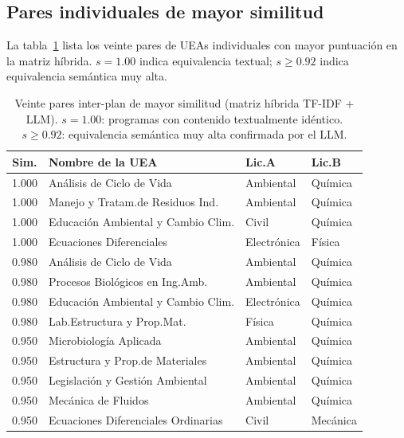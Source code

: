 \documentclass[11pt,a4paper]{article}
\begin{document}
\subsection{Pares individuales de mayor similitud}
\label{sec:top_inter}

La tabla~\ref{tab:inter} lista los veinte pares de UEAs individuales con mayor puntuación en la matriz híbrida.
$s = 1.00$ indica equivalencia textual; $s \geq 0.92$ indica equivalencia semántica muy alta.

\begin{table}[H]
\centering
\caption{Veinte pares inter-plan de mayor similitud (matriz híbrida TF-IDF + LLM).
  $s = 1.00$: programas con contenido textualmente idéntico.
  $s \geq 0.92$: equivalencia semántica muy alta confirmada por el LLM.}
\label{tab:inter}
\small\setlength{\tabcolsep}{4pt}
\begin{tabular}{clll}
\toprule
\textbf{Sim.} & \textbf{Nombre de la UEA} & \textbf{Lic.\@ A} & \textbf{Lic.\@ B} \\
\midrule
1.000 & Análisis de Ciclo de Vida           & Ambiental   & Química \\
1.000 & Manejo y Tratam.\@ de Residuos Ind. & Ambiental   & Química \\
1.000 & Educación Ambiental y Cambio Clim.  & Civil       & Química \\
1.000 & Ecuaciones Diferenciales            & Electrónica & Física  \\
0.980 & Análisis de Ciclo de Vida           & Ambiental   & Química \\
0.980 & Procesos Biológicos en Ing.\@ Amb.  & Ambiental   & Química \\
0.980 & Educación Ambiental y Cambio Clim.  & Electrónica & Química \\
0.980 & Lab.\@ Estructura y Prop.\@ Mat.    & Física      & Química \\
0.950 & Microbiología Aplicada              & Ambiental   & Química \\
0.950 & Estructura y Prop.\@ de Materiales  & Ambiental   & Química \\
0.950 & Legislación y Gestión Ambiental     & Ambiental   & Química \\
0.950 & Mecánica de Fluidos                 & Ambiental   & Química \\
0.950 & Ecuaciones Diferenciales Ordinarias & Civil       & Mecánica \\

\end{tabular}
\end{table}
\end{document}
